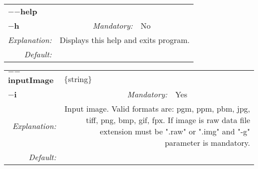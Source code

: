 \begin{center}\begin{tabular}{|rr|rlrl|}
\hline
\multicolumn{2}{|l|}{\textbf{$-$$-$help}} & \multicolumn{4}{|l|}{} \\
\cline{3-6}
\multicolumn{2}{|l|}{\textbf{$-$h}} & \emph{Mandatory:} & No & &  \\
\hline
\emph{Explanation:} & \multicolumn{5}{|p{12cm}|}{Displays this help and exits program.} \\
\hline
\emph{Default:} & \multicolumn{5}{|p{12cm}|}{} \\
\hline
\end{tabular}\end{center}
\begin{center}\begin{tabular}{|rr|rlrl|}
\hline
\multicolumn{2}{|l|}{\textbf{$-$$-$inputImage}} & \multicolumn{4}{|l|}{$\{$string$\}$} \\
\cline{3-6}
\multicolumn{2}{|l|}{\textbf{$-$i}} & \emph{Mandatory:} & Yes & &  \\
\hline
\emph{Explanation:} & \multicolumn{5}{|p{12cm}|}{Input image. Valid formats are: pgm, ppm, pbm, jpg, tiff, png, bmp, gif, fpx. If image is raw data file extension must be ".raw" or ".img" and "-g" parameter is mandatory.} \\
\hline
\emph{Default:} & \multicolumn{5}{|p{12cm}|}{} \\
\hline
\end{tabular}\end{center}
